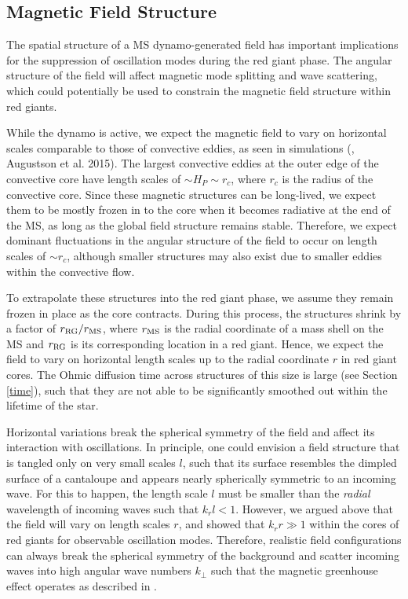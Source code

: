 \subsection{Magnetic Field Structure}
\label{fieldstruc}

The spatial structure of a MS dynamo-generated field has important implications for the suppression of oscillation modes during the red giant phase.
The angular structure of the field will affect magnetic mode splitting and wave scattering, which could potentially be used to constrain the magnetic field structure within red giants.

While the dynamo is active, we expect the magnetic field to vary on horizontal scales comparable to those of convective eddies, as seen in simulations (\citealt{Featherstone_2009}, Augustson et al. 2015). The largest convective eddies at the outer edge of the convective core have length scales of $\sim \! H_P \sim \! r_c$, where $r_c$ is the radius of the convective core. Since these magnetic structures can be long-lived, we expect them to be mostly frozen in to the core when it becomes radiative at the end of the MS, as long as the global field structure remains stable. Therefore, we expect dominant fluctuations in the angular structure of the field to occur on length scales of $\sim \! r_c$, although smaller structures may also exist due to smaller eddies within the convective flow.

To extrapolate these structures into the red giant phase, we assume they remain frozen in place as the core contracts. During this process, the structures shrink by a factor of $r_{\rm RG}/r_{\rm MS}$, where $r_{\rm MS}$ is the radial coordinate of a mass shell on the MS and $r_{\rm RG}$ is its corresponding location in a red giant. Hence, we expect the field to vary on horizontal length scales up to the radial coordinate $r$ in red giant cores. The Ohmic diffusion time across structures of this size is large (see Section \ref{time}), such that they are not able to be significantly smoothed out within the lifetime of the star.

Horizontal variations break the spherical symmetry of the field and affect its interaction with oscillations. In principle, one could envision a field structure that is tangled only on very small scales $l$, such that its surface resembles the dimpled surface of a cantaloupe and appears nearly spherically symmetric to an incoming wave. For this to happen, the length scale $l$ must be smaller than the {\it radial} wavelength of incoming waves such that $k_r l < 1$. However, we argued above that the field will vary on length scales $r$, and \cite{Fuller_2015} showed that $k_r r \gg 1$ within the cores of red giants for observable oscillation modes. Therefore, realistic field configurations can always break the spherical symmetry of the background and scatter incoming waves into high angular wave numbers $k_\perp$ such that the magnetic greenhouse effect operates as described in \cite{Fuller_2015}.
